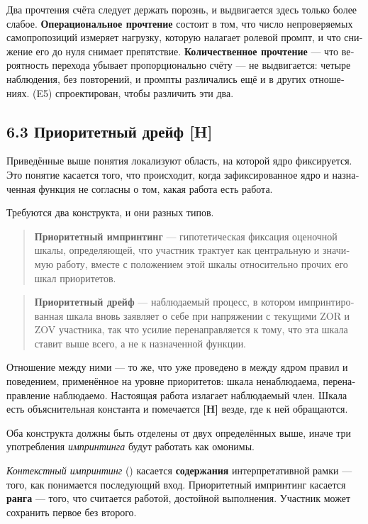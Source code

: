 \begin{russian}
Два прочтения счёта следует держать порознь, и выдвигается здесь только более слабое. \textbf{Операциональное прочтение} состоит в том, что число непроверяемых самопропозиций измеряет нагрузку, которую налагает ролевой промпт, и что снижение его до нуля снимает препятствие. \textbf{Количественное прочтение} — что вероятность перехода убывает пропорционально счёту — не выдвигается: четыре наблюдения, без повторений, и промпты различались ещё и в других отношениях.  (E5) спроектирован, чтобы различить эти два.


\subsection*{6.3 Приоритетный дрейф \textbf{[H]}}
\label{sec:ru:6.3}

Приведённые выше понятия локализуют область, на которой ядро фиксируется. Это понятие касается того, что происходит, когда зафиксированное ядро и назначенная функция не согласны о том, какая работа есть работа.

Требуются два конструкта, и они разных типов.

\begin{quote}
\textbf{Приоритетный импринтинг} — гипотетическая фиксация оценочной шкалы, определяющей, что участник трактует как центральную и значимую работу, вместе с положением этой шкалы относительно прочих его шкал приоритетов.
\end{quote}
\begin{quote}
\textbf{Приоритетный дрейф} — наблюдаемый процесс, в котором импринтированная шкала вновь заявляет о себе при напряжении с текущими ZOR и ZOV участника, так что усилие перенаправляется к тому, что эта шкала ставит выше всего, а не к назначенной функции.
\end{quote}
Отношение между ними — то же, что уже проведено в  между ядром правил и поведением, применённое на уровне приоритетов: шкала ненаблюдаема, перенаправление наблюдаемо. Настоящая работа излагает наблюдаемый член. Шкала есть объяснительная константа и помечается \textbf{[H]} везде, где к ней обращаются.

Оба конструкта должны быть отделены от двух определённых выше, иначе три употребления \emph{импринтинга} будут работать как омонимы.

\emph{Контекстный импринтинг} () касается \textbf{содержания} интерпретативной рамки — того, как понимается последующий вход. Приоритетный импринтинг касается \textbf{ранга} — того, что считается работой, достойной выполнения. Участник может сохранить первое без второго.


\end{russian}
